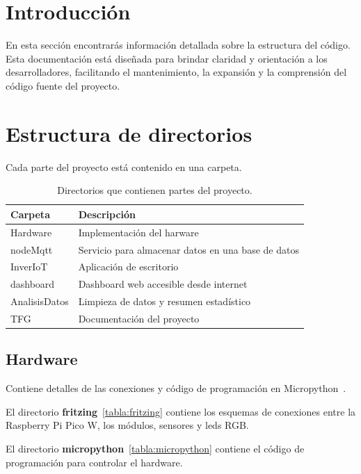
\section{Introducción}

En esta sección encontrarás información detallada sobre la estructura del código. Esta documentación está diseñada para brindar claridad y orientación a los desarrolladores, facilitando el mantenimiento, la expansión y la comprensión del código fuente del proyecto.

\section{Estructura de directorios}
Cada parte del proyecto está contenido en una carpeta.

\begin{table}[htbp]
\begin{center}
\caption{Directorios que contienen partes del proyecto.}
\begin{tabular}{|l|l|} %
\hline
\rowcolor[HTML]{C0C0C0} 
\textbf{Carpeta} & \textbf{Descripción}\\ \hline
Hardware &  Implementación del harware\\ \hline
nodeMqtt & Servicio para almacenar datos en una base de datos \\ \hline
InverIoT &  Aplicación de escritorio\\ \hline
dashboard &  Dashboard web accesible desde internet \\ \hline
AnalisisDatos & Limpieza de datos y resumen estadístico \\ \hline
TFG & Documentación del proyecto \\ \hline
\end{tabular}
\end{center}
\end{table}

\subsection{Hardware}
Contiene detalles de las conexiones y código de programación en Micropython~\cite{wiki:micropython}.

El directorio \textbf{fritzing}~\ref{tabla:fritzing} contiene los esquemas de conexiones entre la Raspberry Pi Pico W, los módulos, sensores y leds RGB.

El directorio \textbf{micropython}~\ref{tabla:micropython} contiene el código de programación para controlar el hardware.

